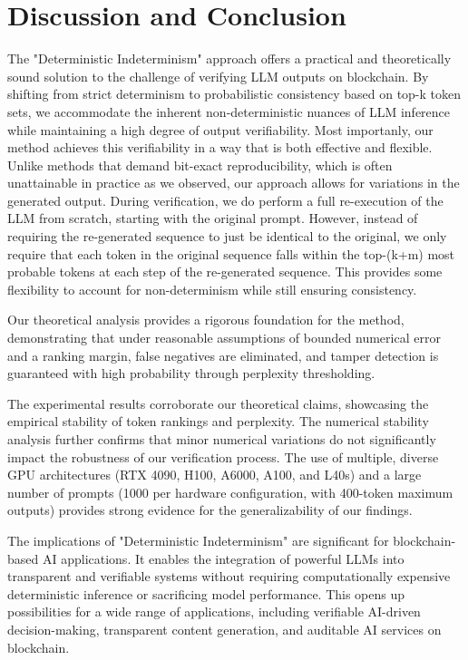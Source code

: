 \documentclass{article}
\begin{document}
\section{Discussion and Conclusion}

The "Deterministic Indeterminism" approach offers a practical and theoretically sound solution to the challenge of verifying LLM outputs on blockchain. By shifting from strict determinism to probabilistic consistency based on top-k token sets, we accommodate the inherent non-deterministic nuances of LLM inference while maintaining a high degree of output verifiability.  Most importanly, our method achieves this verifiability in a way that is both effective and flexible.  Unlike methods that demand bit-exact reproducibility, which is often unattainable in practice as we observed, our approach allows for variations in the generated output.  During verification, we do perform a full re-execution of the LLM from scratch, starting with the original prompt. However, instead of requiring the re-generated sequence to just be identical to the original, we only require that each token in the original sequence falls within the top-(k+m) most probable tokens at each step of the re-generated sequence. This provides some flexibility to account for non-determinism while still ensuring consistency.

Our theoretical analysis provides a rigorous foundation for the method, demonstrating that under reasonable assumptions of bounded numerical error and a ranking margin, false negatives are eliminated, and tamper detection is guaranteed with high probability through perplexity thresholding.

The experimental results corroborate our theoretical claims, showcasing the empirical stability of token rankings and perplexity. The numerical stability analysis further confirms that minor numerical variations do not significantly impact the robustness of our verification process.  The use of multiple, diverse GPU architectures (RTX 4090, H100, A6000, A100, and L40s) and a large number of prompts (1000 per hardware configuration, with 400-token maximum outputs) provides strong evidence for the generalizability of our findings.

The implications of "Deterministic Indeterminism" are significant for blockchain-based AI applications. It enables the integration of powerful LLMs into transparent and verifiable systems without requiring computationally expensive deterministic inference or sacrificing model performance. This opens up possibilities for a wide range of applications, including verifiable AI-driven decision-making, transparent content generation, and auditable AI services on blockchain.
\end{document}
